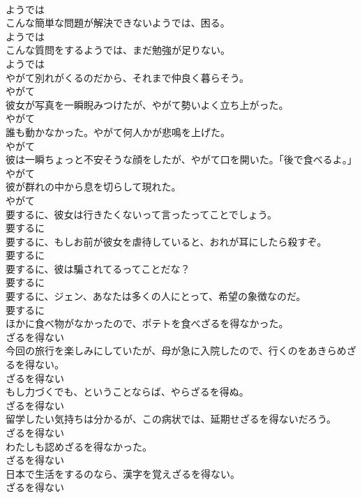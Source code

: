 \documentclass[8pt]{extreport}
\begin{document}
\begin{CJK}{UTF8}{min}
\\	ようでは
\\	こんな簡単な問題が解決できないようでは、困る。	
\\	ようでは
\\	こんな質問をするようでは、まだ勉強が足りない。	
\\	ようでは
\\	やがて別れがくるのだから、それまで仲良く暮らそう。	
\\	やがて
\\	彼女が写真を一瞬睨みつけたが、やがて勢いよく立ち上がった。	
\\	やがて
\\	誰も動かなかった。やがて何人かが悲鳴を上げた。	
\\	やがて
\\	彼は一瞬ちょっと不安そうな顔をしたが、やがて口を開いた。「後で食べるよ。」	
\\	やがて
\\	彼が群れの中から息を切らして現れた。	
\\	やがて
\\	要するに、彼女は行きたくないって言ったってことでしょう。	
\\	要するに
\\	要するに、もしお前が彼女を虐待していると、おれが耳にしたら殺すぞ。	
\\	要するに
\\	要するに、彼は騙されてるってことだな？	
\\	要するに
\\	要するに、ジェン、あなたは多くの人にとって、希望の象徴なのだ。	
\\	要するに
\\	ほかに食べ物がなかったので、ポテトを食べざるを得なかった。	
\\	ざるを得ない
\\	今回の旅行を楽しみにしていたが、母が急に入院したので、行くのをあきらめざるを得ない。	
\\	ざるを得ない
\\	もし力づくでも、ということならば、やらざるを得ぬ。	
\\	ざるを得ない
\\	留学したい気持ちは分かるが、この病状では、延期せざるを得ないだろう。	
\\	ざるを得ない
\\	わたしも認めざるを得なかった。	
\\	ざるを得ない
\\	日本で生活をするのなら、漢字を覚えざるを得ない。	
\\	ざるを得ない

\end{CJK}
\end{document}

